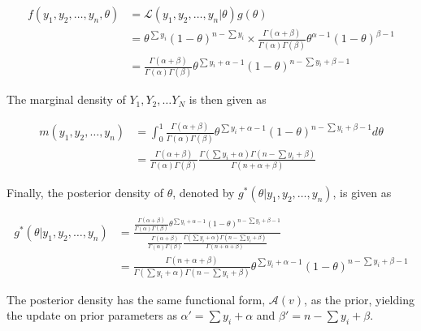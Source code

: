\begin{equation}
	\label{eq:probability:bayesian_statistic:bayesian_analysis:step_3}
	\begin{split}
		f(y_{1}, y_{2}, \dots, y_{n}, \theta)
		&= \mathcal{L}(y_{1}, y_{2}, \dots, y_{n} \vert \theta)g(\theta)\\
		&= \theta^{\sum y_{i}}(1-\theta)^{n-\sum y_{i}} \times \frac{\Gamma(\alpha + \beta)}{\Gamma(\alpha)\Gamma(\beta)}\theta^{\alpha - 1}(1 - \theta)^{\beta  - 1}\\
		&= \frac{\Gamma(\alpha + \beta)}{\Gamma(\alpha)\Gamma(\beta)}\theta^{\sum y_{i} + \alpha - 1}(1-\theta)^{n - \sum y_{i} + \beta - 1}
	\end{split}
\end{equation}

The marginal density of $Y_{1}, Y_{2}, \dots Y_{N}$ is then given as

\begin{equation}
	\label{eq:probability:bayesian_statistic:bayesian_analysis:step_4}
	\begin{split}
		m(y_{1}, y_{2}, \dots, y_{n})
		&= \int_{0}^{1}\frac{\Gamma(\alpha + \beta)}{\Gamma(\alpha)\Gamma(\beta)}\theta^{\sum y_{i} + \alpha - 1}(1-\theta)^{n - \sum y_{i} + \beta - 1}d\theta\\
		&= \frac{\Gamma(\alpha + \beta)}{\Gamma(\alpha)\Gamma(\beta)}\frac{\Gamma(\sum y_{i} + \alpha)\Gamma(n - \sum y_{i} + \beta)}{\Gamma(n + \alpha + \beta)}
	\end{split}
\end{equation}

Finally, the posterior density of $\theta$, denoted by $g^{*}(\theta \vert y_{1}, y_{2}, \dots, y_{n})$, is given as

\begin{equation}
	\label{eq:probability:bayesian_statistic:bayesian_analysis:step_5}
	\begin{split}
		g^{*}(\theta \vert y_{1}, y_{2}, \dots, y_{n})
		&= \frac{\frac{\Gamma(\alpha + \beta)}{\Gamma(\alpha)\Gamma(\beta)}\theta^{\sum y_{i} + \alpha - 1}(1-\theta)^{n - \sum y_{i} + \beta - 1}}{\frac{\Gamma(\alpha + \beta)}{\Gamma(\alpha)\Gamma(\beta)}\frac{\Gamma(\sum y_{i} + \alpha)\Gamma(n - \sum y_{i} + \beta)}{\Gamma(n + \alpha + \beta)}}\\
		&= \frac{\Gamma(n + \alpha + \beta)}{\Gamma(\sum y_{i} + \alpha)\Gamma(n - \sum y_{i} + \beta)}\theta^{\sum y_{i} + \alpha - 1}(1-\theta)^{n - \sum y_{i} + \beta - 1}
	\end{split}
\end{equation}

The posterior density has the same functional form, $\mathcal{A}(v)$, as the prior, yielding the update on prior parameters as $\alpha' = \sum y_{i} + \alpha$ and $\beta' = n - \sum y_{i} + \beta$.

